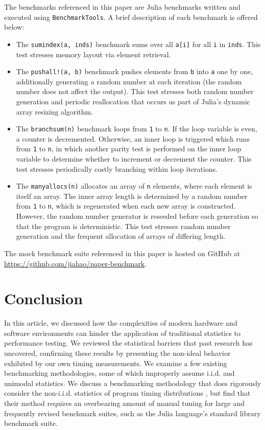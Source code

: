 \documentclass[conference]{IEEEtran}
\begin{document}
The benchmarks referenced in this paper are Julia benchmarks written and executed using
\lstinline|BenchmarkTools|. A brief description of each benchmark is offered below:

\begin{itemize}
    \item The \lstinline|sumindex(a, inds)| benchmark sums over all \lstinline|a[i]| for all
    \lstinline|i| in \lstinline|inds|. This test stresses memory layout via element
    retrieval.
    \item The \lstinline|pushall!(a, b)| benchmark pushes elements from \lstinline|b| into
    \lstinline|a| one by one, additionally generating a random number at each iteration (the
    random number does not affect the output). This test stresses both random number
    generation and periodic reallocation that occurs as part of Julia's dynamic array
    resizing algorithm.
    \item The \lstinline|branchsum(n)| benchmark loops from \lstinline|1| to \lstinline|n|.
    If the loop variable is even, a counter is decremented. Otherwise, an inner loop is
    triggered which runs from \lstinline|1| to \lstinline|n|, in which another parity test
    is performed on the inner loop variable to determine whether to increment or decrement
    the counter. This test stresses periodically costly branching within loop iterations.
    \item The \lstinline|manyallocs(n)| allocates an array of \lstinline|n| elements, where
    each element is itself an array. The inner array length is determined by a random number
    from \lstinline|1| to \lstinline|n|, which is regenerated when each new array is
    constructed. However, the random number generator is reseeded before each generation so
    that the program is deterministic. This test stresses random number generation and
    the frequent allocation of arrays of differing length.
\end{itemize}

The mock benchmark suite referenced in this paper is hosted on GitHub at
\url{https://github.com/jiahao/paper-benchmark}.

\section*{Conclusion}
\label{sec:conclusion}

In this article, we discussed how the complexities of modern hardware and software
environments can hinder the application of traditional statistics to performance testing. We
reviewed the statistical barriers that past research has uncovered, confirming these
results by presenting the non-ideal behavior exhibited by our own timing measurements. We
examine a few existing benchmarking methodologies, some of which improperly assume i.i.d.
and unimodal statistics. We discuss a benchmarking methodology that does rigorously consider
the non-i.i.d. statistics of program timing distributions \cite{Kalibera2013}, but find that
their method requires an overbearing amount of manual tuning for large and frequently
revised benchmark suites, such as the Julia language's standard library benchmark suite.
\end{document}
